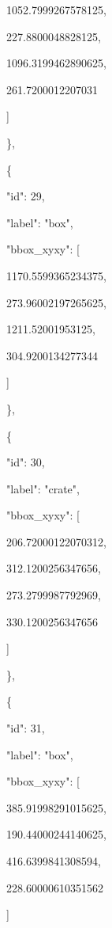 \documentclass[10pt,a4paper]{article}
\begin{document}
        1052.7999267578125,\allowbreak{}\par
        227.8800048828125,\allowbreak{}\par
        1096.3199462890625,\allowbreak{}\par
        261.7200012207031\par
      ]\par
    \},\allowbreak{}\par
    \{\par
      "id":\allowbreak{} 29,\allowbreak{}\par
      "label":\allowbreak{} "box",\allowbreak{}\par
      "bbox\_xyxy":\allowbreak{} [\par
        1170.5599365234375,\allowbreak{}\par
        273.96002197265625,\allowbreak{}\par
        1211.52001953125,\allowbreak{}\par
        304.9200134277344\par
      ]\par
    \},\allowbreak{}\par
    \{\par
      "id":\allowbreak{} 30,\allowbreak{}\par
      "label":\allowbreak{} "crate",\allowbreak{}\par
      "bbox\_xyxy":\allowbreak{} [\par
        206.72000122070312,\allowbreak{}\par
        312.1200256347656,\allowbreak{}\par
        273.2799987792969,\allowbreak{}\par
        330.1200256347656\par
      ]\par
    \},\allowbreak{}\par
    \{\par
      "id":\allowbreak{} 31,\allowbreak{}\par
      "label":\allowbreak{} "box",\allowbreak{}\par
      "bbox\_xyxy":\allowbreak{} [\par
        385.91998291015625,\allowbreak{}\par
        190.44000244140625,\allowbreak{}\par
        416.6399841308594,\allowbreak{}\par
        228.60000610351562\par
      ]\par
\end{document}
